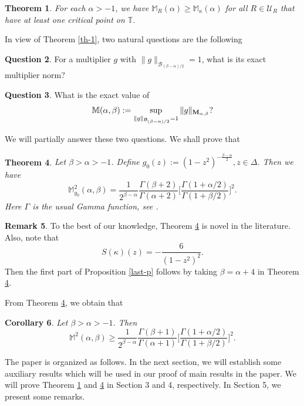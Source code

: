 \documentclass[10pt]{amsart}
\newtheorem{theorem}{Theorem}[section]
\newtheorem{corollary}[theorem]{Corollary}
\theoremstyle{definition}    %
\newtheorem{remark}[theorem]{Remark}
\newtheorem{question}[theorem]{Question}
\numberwithin{equation}{section}
\begin{document}
\begin{theorem}\label{m-1}
For each $\alpha>-1$, we have $\mathbb{M}_R(\alpha)\geq \mathbb{M}_{\kappa}(\alpha)$ for all $R\in \mathcal{U}_R$ that have at least one critical point on $\mathbb{T}.$ 
\end{theorem}

In view of Theorem \ref{th-1}, two natural questions are the following
\begin{question} For a multiplier $g$ with $\|g\|_{{\mathcal B}_{(\beta-\alpha)/2}}=1$, what is its exact multiplier norm? \end{question}
\begin{question} What is the exact value of 
$$\mathbb{M}(\alpha, \beta):=\sup_{\|g\|_{{\mathcal B}_{(\beta-\alpha)/2}}=1}\|g\|_{{\bf M}_{\alpha, \beta}}?$$\end{question}

We will partially answer these two questions. We shall prove that
 \begin{theorem}\label{m-2}
Let $\beta>\alpha>-1$. Define $g_0(z):=(1-z^2)^{-\frac{\beta-\alpha}{2}}, z\in \Delta$. Then we have 
$$\mathbb{M}_{g_0}^2(\alpha, \beta)=\frac{1}{2^{\beta-\alpha}}\frac{\Gamma(\beta+2)}{\Gamma(\alpha+2)}\Big[\frac{\Gamma(1+\alpha/2)}{\Gamma(1+\beta/2)}\Big]^2.$$
Here $\Gamma$ is the usual Gamma function, see \cite{AAR}. 
\end{theorem}
\begin{remark}To the best of our knowledge, Theorem \ref{m-2} is novel in the literature. Also, note that $$S(\kappa)(z)=-\frac{6}{(1-z^2)^2}. $$Then the first part of Proposition \ref{last-p} follows by taking $\beta=\alpha+4$ in Theorem \ref{m-2}. 
\end{remark}
From Theorem \ref{m-2}, we obtain that  
\begin{corollary}Let $\beta>\alpha>-1$. Then
$$\mathbb{M}^2(\alpha, \beta)\geq \frac{1}{2^{\beta-\alpha}}\frac{\Gamma(\beta+1)}{\Gamma(\alpha+1)}\Big[\frac{\Gamma(1+\alpha/2)}{\Gamma(1+\beta/2)}\Big]^2.$$
\end{corollary}


The paper is organized as follows. In the next section, we will establish some auxiliary results which will be used in our proof of main results in the paper. We will prove Theorem \ref{m-1} and \ref{m-2} in Section 3 and 4, respectively. In Section 5, we present some remarks.  
\end{document}
